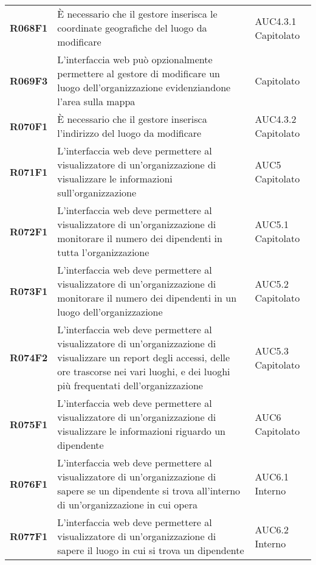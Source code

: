 \documentclass[../analisi-dei-requisiti.tex]{subfiles}
\begin{document}
\begin{longtable}[H]{>{\centering\bfseries}m{3cm} >{\centering}m{10cm} >{\centering\arraybackslash}m{3cm}}
  R068F1                               & È necessario che il gestore inserisca le coordinate geografiche del luogo da modificare                                                                                                                 & AUC4.3.1 Capitolato           \\
  R069F3                               & L'interfaccia web può opzionalmente permettere al gestore di modificare un luogo dell'organizzazione evidenziandone l'area sulla mappa                                                                  & Capitolato                    \\
  R070F1                               & È necessario che il gestore inserisca l'indirizzo del luogo da modificare                                                                                                                               & AUC4.3.2 Capitolato           \\
  R071F1                               & L'interfaccia web deve permettere al visualizzatore di un'organizzazione di visualizzare le informazioni sull'organizzazione                                                                            & AUC5 Capitolato               \\
  R072F1                               & L'interfaccia web deve permettere al visualizzatore di un'organizzazione di monitorare il numero dei dipendenti in tutta l'organizzazione                                                               & AUC5.1 Capitolato             \\
  R073F1                               & L'interfaccia web deve permettere al visualizzatore di un'organizzazione di monitorare il numero dei dipendenti in un luogo dell'organizzazione                                                         & AUC5.2 Capitolato             \\
  R074F2                               & L'interfaccia web deve permettere al visualizzatore di un'organizzazione di visualizzare un report degli accessi, delle ore trascorse nei vari luoghi, e dei luoghi più frequentati dell'organizzazione & AUC5.3 Capitolato             \\
  R075F1                               & L'interfaccia web deve permettere al visualizzatore di un'organizzazione di visualizzare le informazioni riguardo un dipendente                                                                         & AUC6 Capitolato               \\
  R076F1                               & L'interfaccia web deve permettere al visualizzatore di un'organizzazione di sapere se un dipendente si trova all'interno di un'organizzazione in cui opera                                              & AUC6.1 Interno                \\
  R077F1                               & L'interfaccia web deve permettere al visualizzatore di un'organizzazione di sapere il luogo in cui si trova un dipendente                                                                               & AUC6.2 Interno                \\


\end{longtable}
\end{document}
